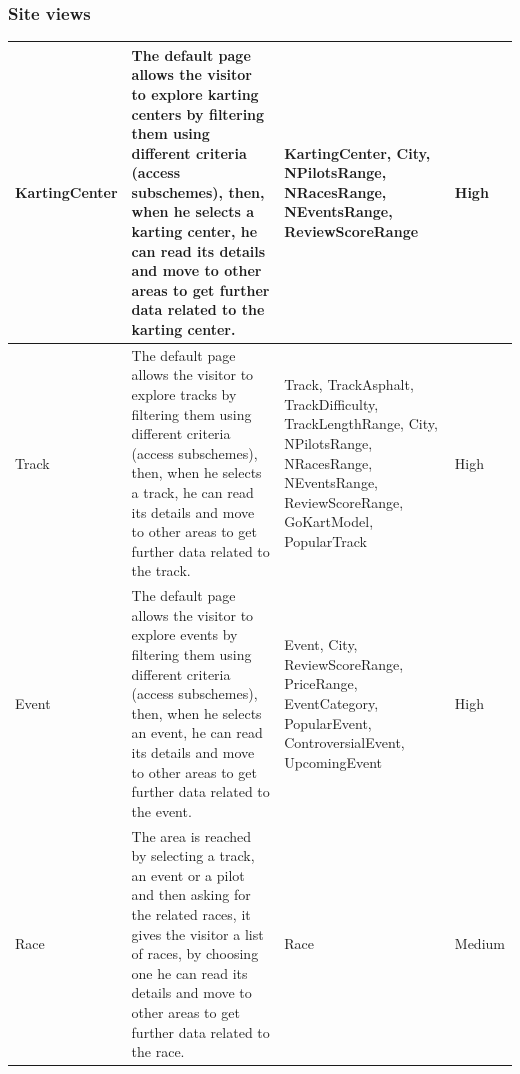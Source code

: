 \documentclass{beamer}
\begin{document}
\begin{frame}
    \frametitle{Site views}
    \begin{table}
        \centering
        \tiny
        \setlength{\tabcolsep}{1pt}
        \begin{tabular}{|m{2cm}|m{4cm}|m{3cm}|m{1cm}|}
        \hline
        KartingCenter & The default page allows the visitor to explore karting centers
        by filtering them using different criteria (access subschemes), then, when he selects a karting center,
        he can read its details and move to other areas to get further data related to the karting center.
         & KartingCenter, City, NPilotsRange, NRacesRange, NEventsRange, ReviewScoreRange & High \\
        \hline
        Track & The default page allows the visitor to explore tracks
        by filtering them using different criteria (access subschemes), then, when he selects a track,
        he can read its details and move to other areas to get further data related to the track.
        & Track, TrackAsphalt, TrackDifficulty, TrackLengthRange, City, NPilotsRange, NRacesRange, NEventsRange, ReviewScoreRange,
        GoKartModel, PopularTrack & High \\
        \hline
        Event & The default page allows the visitor to explore events
        by filtering them using different criteria (access subschemes), then, when he selects an event,
        he can read its details and move to other areas to get further data related to the event.
         & Event, City, ReviewScoreRange, PriceRange, EventCategory, PopularEvent, ControversialEvent, 
        UpcomingEvent & High \\
        \hline
        Race & The area is reached by selecting a track, an event or a pilot and then asking for
        the related races, it gives the visitor
        a list of races, by choosing one he can read its details and move to other areas to get further data
        related to the race.
         & Race & Medium \\
        \hline        
        \end{tabular}
    \end{table}
\end{frame}
\end{document}
